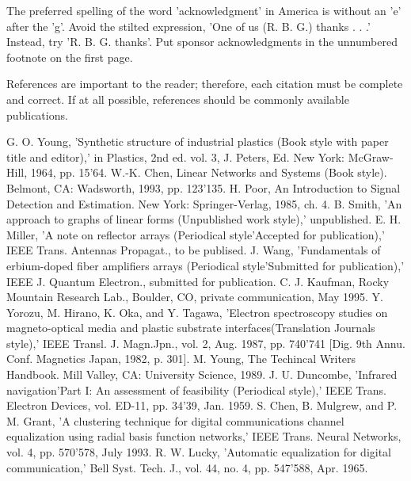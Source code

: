 \documentclass[letterpaper, 10 pt, conference]{ieeeconf}  %
\begin{document}
The preferred spelling of the word 'acknowledgment' in America is without an 'e' after the 'g'. Avoid the stilted expression, 'One of us (R. B. G.) thanks . . .'  Instead, try 'R. B. G. thanks'. Put sponsor acknowledgments in the unnumbered footnote on the first page.




References are important to the reader; therefore, each citation must be complete and correct. If at all possible, references should be commonly available publications.



\begin{thebibliography}{99}

 G. O. Young, 'Synthetic structure of industrial plastics (Book style with paper title and editor),' 	in Plastics, 2nd ed. vol. 3, J. Peters, Ed.  New York: McGraw-Hill, 1964, pp. 15'64.
 W.-K. Chen, Linear Networks and Systems (Book style).	Belmont, CA: Wadsworth, 1993, pp. 123'135.
 H. Poor, An Introduction to Signal Detection and Estimation.   New York: Springer-Verlag, 1985, ch. 4.
 B. Smith, 'An approach to graphs of linear forms (Unpublished work style),' unpublished.
 E. H. Miller, 'A note on reflector arrays (Periodical style'Accepted for publication),' IEEE Trans. Antennas Propagat., to be publised.
 J. Wang, 'Fundamentals of erbium-doped fiber amplifiers arrays (Periodical style'Submitted for publication),' IEEE J. Quantum Electron., submitted for publication.
 C. J. Kaufman, Rocky Mountain Research Lab., Boulder, CO, private communication, May 1995.
 Y. Yorozu, M. Hirano, K. Oka, and Y. Tagawa, 'Electron spectroscopy studies on magneto-optical media and plastic substrate interfaces(Translation Journals style),' IEEE Transl. J. Magn.Jpn., vol. 2, Aug. 1987, pp. 740'741 [Dig. 9th Annu. Conf. Magnetics Japan, 1982, p. 301].
 M. Young, The Techincal Writers Handbook.  Mill Valley, CA: University Science, 1989.
 J. U. Duncombe, 'Infrared navigation'Part I: An assessment of feasibility (Periodical style),' IEEE Trans. Electron Devices, vol. ED-11, pp. 34'39, Jan. 1959.
 S. Chen, B. Mulgrew, and P. M. Grant, 'A clustering technique for digital communications channel equalization using radial basis function networks,' IEEE Trans. Neural Networks, vol. 4, pp. 570'578, July 1993.
 R. W. Lucky, 'Automatic equalization for digital communication,' Bell Syst. Tech. J., vol. 44, no. 4, pp. 547'588, Apr. 1965.

\end{thebibliography}
\end{document}
